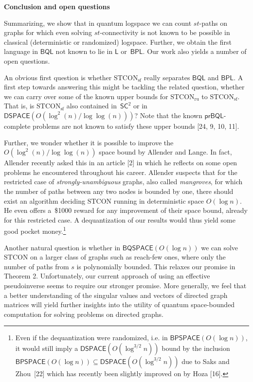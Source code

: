 \par\medskip\noindent\textbf{Conclusion and open questions}\par




Summarizing, we show that in quantum logspace we can count $st$-paths on graphs for which even solving $st$-connectivity is not known to be possible in classical (deterministic or randomized) logspace.
Further, we obtain the first language in $\mathsf{BQL}$ not known to lie in $\mathsf{L}$ or $\mathsf{BPL}$.
Our work also yields a number of open questions.\par




An obvious first question is whether $\mathrm{STCON}_{\mathrm{sf}}$ really separates $\mathsf{BQL}$ and $\mathsf{BPL}$.
A first step towards answering this might be tackling the related question, whether we can carry over some of the known upper bounds for $\mathrm{STCON}_{\mathrm{ru}}$ to $\mathrm{STCON}_{\mathrm{sf}}$. That is, is $\mathrm{STCON}_{\mathrm{sf}}$ also contained in $\mathsf{SC}^{2}$ or in $\mathsf{DSPACE}(O(\log^{2}(n)/\log\log(n)))$?
Note that the known $\mathsf{prBQL}$-complete problems are not known to satisfy these upper bounds [24, 9, 10, 11].\par




Further, we wonder whether it is possible to improve the $O(\log^{2}(n)/\log\log(n))$ space bound by Allender and Lange.
In fact, Allender recently asked this in an article [2] in which he reflects on some open problems he encountered throughout his career. Allender suspects that for the restricted case of \emph{strongly-unambiguous} graphs, also called \emph{mangroves}, for which the number of paths between any two nodes is bounded by one, there should exist an algorithm deciding $\mathrm{STCON}$ running in deterministic space $O(\log n)$. He even offers a \$1000 reward for any improvement of their space bound, already for this restricted case. A dequantization of our results would thus yield some good pocket money.\footnote{Even if the dequantization were randomized, i.e. in $\mathsf{BPSPACE}(O(\log n))$, it would still imply a $\mathsf{DSPACE}(O(\log^{3/2}n))$ bound by the inclusion $\mathsf{BPSPACE}(O(\log n))\subseteq\mathsf{DSPACE}(O(\log^{3/2}n))$ due to Saks and Zhou [22] which has recently been slightly improved on by Hoza [16].}\par




Another natural question is whether in $\mathsf{BQSPACE}(O(\log n))$ we can solve $\mathrm{STCON}$ on a larger class of graphs such as reach-few ones, where only the number of paths from $s$ is polynomially bounded.
This relaxes our promise in Theorem 2.
Unfortunately, our current approach of using an effective pseudoinverse seems to require our stronger promise.
More generally, we feel that a better understanding of the singular values and vectors of directed graph matrices will yield further insights into the utility of quantum space-bounded computation for solving problems on directed graphs.\par




